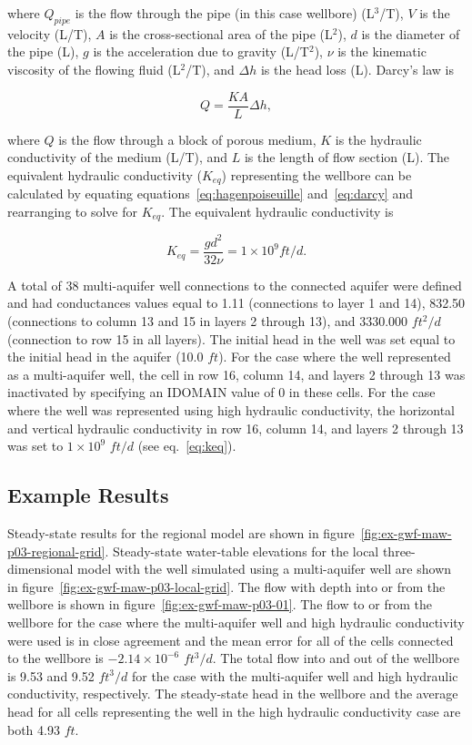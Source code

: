 \noindent where $Q_{pipe}$ is the flow through the pipe (in this case wellbore) (L$^{3}$/T), $V$ is the velocity (L/T), $A$ is the cross-sectional area of the pipe (L$^{2}$), $d$ is the diameter of the pipe (L), $g$ is the acceleration due to gravity (L/T$^{2}$), $\nu$ is the kinematic viscosity of the flowing fluid (L$^{2}$/T), and $\Delta h$ is the head loss (L). Darcy's law is

\begin{equation}
	\label{eq:darcy}
	Q = \frac{K A}{L} \Delta h,
\end{equation}

\noindent where $Q$ is the flow through a block of porous medium, $K$ is the hydraulic conductivity of the medium (L/T), and $L$ is the length of flow section (L). The equivalent hydraulic conductivity ($K_{eq}$) representing the wellbore can be calculated by equating equations~\ref{eq:hagenpoiseuille} and~\ref{eq:darcy} and rearranging to solve for $K_{eq}$. The equivalent hydraulic conductivity is

\begin{equation}
	\label{eq:keq}
	K_{eq} = \frac{g d^{2}}{32 \nu} = 1 \times 10^{9} ft/d .
\end{equation}

A total of 38 multi-aquifer well connections to the connected aquifer were defined and had conductances values equal to 1.11 (connections to layer 1 and 14), 832.50 (connections to column 13 and 15 in layers 2 through 13), and 3330.000 $ft^{2}/d$ (connection to row 15 in all layers). The initial head in the well was set equal to the initial head in the aquifer (10.0 $ft$). For the case where the well represented as a multi-aquifer well, the cell in row 16, column 14, and layers 2 through 13 was inactivated by specifying an IDOMAIN value of 0 in these cells. For the case where the well was represented using high hydraulic conductivity, the horizontal and vertical hydraulic conductivity in row 16, column 14, and layers 2 through 13 was set to $1 \times 10^{9}$ $ft/d$ (see eq.~\ref{eq:keq}).

\subsection{Example Results}

Steady-state results for the regional model are shown in figure~\ref{fig:ex-gwf-maw-p03-regional-grid}. Steady-state water-table elevations for the local three-dimensional model with the well simulated using a multi-aquifer well are shown in figure~\ref{fig:ex-gwf-maw-p03-local-grid}. The flow with depth into or from the wellbore is shown in figure~\ref{fig:ex-gwf-maw-p03-01}. The flow to or from the wellbore for the case where the multi-aquifer well and high hydraulic conductivity were used is in close agreement and the mean error for all of the cells connected to the wellbore  is $-2.14 \times 10^{-6}$ $ft^{3}/d$. The total flow into and out of the wellbore is 9.53 and 9.52 $ft^{3}/d$ for the case with the multi-aquifer well and high hydraulic conductivity, respectively. The steady-state head in the wellbore and the average head for all cells representing the well in the high hydraulic conductivity case are both 4.93 $ft$.


